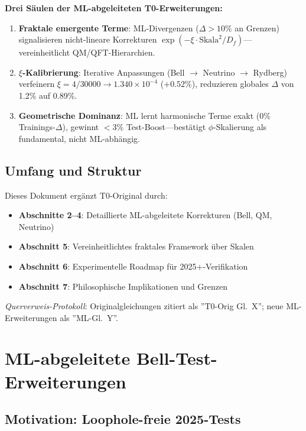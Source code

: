 	\begin{tcolorbox}[colback=green!5!white,colframe=green!75!black,title={Zentrale ML-Ergebnisse}]
		\textbf{Drei Säulen der ML-abgeleiteten T0-Erweiterungen:}
		\begin{enumerate}
			\item \textbf{Fraktale emergente Terme}: ML-Divergenzen ($\Delta>10\%$ an Grenzen) signalisieren nicht-lineare Korrekturen $\exp(-\xi \cdot \text{Skala}^2/D_f)$—vereinheitlicht QM/QFT-Hierarchien.
			\item \textbf{$\xi$-Kalibrierung}: Iterative Anpassungen (Bell $\to$ Neutrino $\to$ Rydberg) verfeinern $\xi = 4/30000 \to 1.340\times10^{-4}$ ($+0.52\%$), reduzieren globales $\Delta$ von 1.2\% auf 0.89\%.
			\item \textbf{Geometrische Dominanz}: ML lernt harmonische Terme exakt (0\% Trainings-$\Delta$), gewinnt $<$3\% Test-Boost—bestätigt $\phi$-Skalierung als fundamental, nicht ML-abhängig.
		\end{enumerate}
	\end{tcolorbox}
	
	\subsection{Umfang und Struktur}
	
	Dieses Dokument ergänzt T0-Original durch:
	\begin{itemize}
		\item \textbf{Abschnitte 2--4}: Detaillierte ML-abgeleitete Korrekturen (Bell, QM, Neutrino)
		\item \textbf{Abschnitt 5}: Vereinheitlichtes fraktales Framework über Skalen
		\item \textbf{Abschnitt 6}: Experimentelle Roadmap für 2025+-Verifikation
		\item \textbf{Abschnitt 7}: Philosophische Implikationen und Grenzen
	\end{itemize}
	
	\textit{Querverweis-Protokoll}: Originalgleichungen zitiert als ''T0-Orig Gl.~X''; neue ML-Erweiterungen als ''ML-Gl.~Y''.
	
	\section{ML-abgeleitete Bell-Test-Erweiterungen}
	
	\subsection{Motivation: Loophole-freie 2025-Tests}
	
